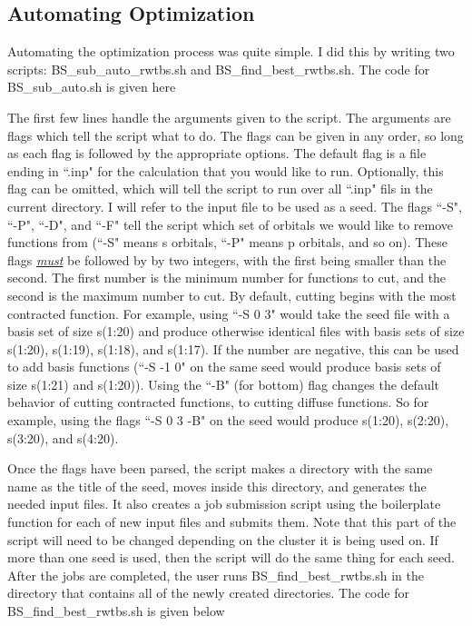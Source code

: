 \subsection{Automating Optimization}
Automating the optimization process was quite simple. I did this by writing two scripts: BS\_sub\_auto\_rwtbs.sh and BS\_find\_best\_rwtbs.sh. The code for BS\_sub\_auto.sh is given here



The first few lines handle the arguments given to the script. The arguments are flags which tell the script what to do. The flags can be given in any order, so long as each flag is followed by the appropriate options. The default flag is a file ending in ``.inp" for the calculation that you would like to run. Optionally, this flag can be omitted, which will tell the script to run over all ``.inp" fils in the current directory. I will refer to the input file to be used as a seed. The flags ``-S", ``-P", ``-D", and ``-F" tell the script which set of orbitals we would like to remove functions from (``-S" means s orbitals, ``-P" means p orbitals, and so on). These flags \textit{\underline{must}} be followed by by two integers, with the first being smaller than the second. The first number is the minimum number for functions to cut, and the second is the maximum number to cut. By default, cutting begins with the most contracted function. For example, using ``-S 0 3" would take the seed file with a basis set of size s(1:20) and produce otherwise identical files with basis sets of size s(1:20), s(1:19), s(1:18), and s(1:17). If the number are negative, this can be used to add basis functions (``-S -1 0" on the same seed would produce basis sets of size s(1:21) and s(1:20)). Using the ``-B" (for bottom) flag changes the default behavior of cutting contracted functions, to cutting diffuse functions. So for example, using the flags ``-S 0 3 -B" on the seed would produce s(1:20), s(2:20), s(3:20), and s(4:20).

Once the flags have been parsed, the script makes a directory with the same name as the title of the seed, moves inside this directory, and generates the needed input files. It also creates a job submission script using the boilerplate function for each of new input files and submits them. Note that this part of the script will need to be changed depending on the cluster it is being used on. If more than one seed is used, then the script will do the same thing for each seed. After the jobs are completed, the user runs BS\_find\_best\_rwtbs.sh in the directory that contains all of the newly created directories. The code for BS\_find\_best\_rwtbs.sh is given below

